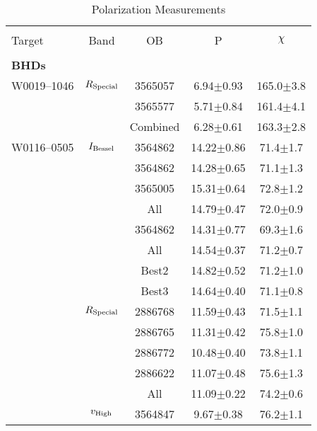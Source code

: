 \begin{table}
    \caption{\label{tab:pols} Polarization Measurements}
    \begin{tabular}{lcccc}
        \hline \hline\\
        Target & Band & OB & P & $\chi$ \\
        \hline\\
        {\bf{BHDs}}\\
        W0019--1046  & $R_{\rm Special}$ & 3565057   &  6.94$\pm$0.93 & 165.0$\pm$3.8 \\
                     &                   & 3565577   &  5.71$\pm$0.84 & 161.4$\pm$4.1 \\
                     &                   & Combined  &  6.28$\pm$0.61 & 163.3$\pm$2.8 \\
        W0116--0505  & $I_{\rm Bessel}$  & 3564862   & 14.22$\pm$0.86 &  71.4$\pm$1.7 \\
                     &                   & 3564862   & 14.28$\pm$0.65 &  71.1$\pm$1.3 \\
                     &                   & 3565005   & 15.31$\pm$0.64 &  72.8$\pm$1.2 \\
                     &                   & All       & 14.79$\pm$0.47 &  72.0$\pm$0.9 \\
                     &                   & 3564862   & 14.31$\pm$0.77 &  69.3$\pm$1.6 \\
                     &                   & All       & 14.54$\pm$0.37 &  71.2$\pm$0.7 \\
                     &                   & Best2     & 14.82$\pm$0.52 &  71.2$\pm$1.0 \\
                     &                   & Best3     & 14.64$\pm$0.40 &  71.1$\pm$0.8 \\
                     & $R_{\rm Special}$ & 2886768   & 11.59$\pm$0.43 &  71.5$\pm$1.1 \\
                     &                   & 2886765   & 11.31$\pm$0.42 &  75.8$\pm$1.0 \\
                     &                   & 2886772   & 10.48$\pm$0.40 &  73.8$\pm$1.1 \\
                     &                   & 2886622   & 11.07$\pm$0.48 &  75.6$\pm$1.3 \\
                     &                   & All       & 11.09$\pm$0.22 &  74.2$\pm$0.6 \\
                     & $v_{\rm High}$    & 3564847   &  9.67$\pm$0.38 &  76.2$\pm$1.1 \\

\end{tabular}
\end{table}
